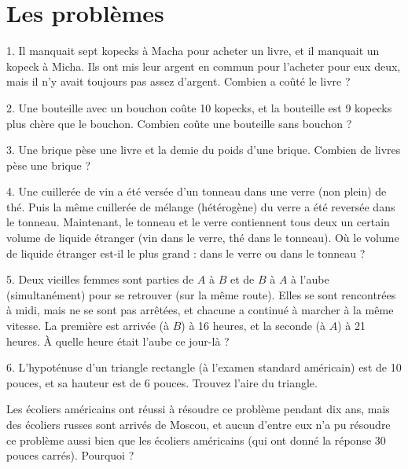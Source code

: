 \clearpage
\section*{Les problèmes}

\begin{problem}{1.}
Il manquait sept kopecks à Macha pour acheter un livre, et il manquait un kopeck à Micha. Ils ont mis leur argent en commun pour l'acheter pour eux deux, mais il n'y avait toujours pas assez d'argent. Combien a coûté le livre ?
\end{problem}

\begin{problem}{2.}
Une bouteille avec un bouchon coûte 10 kopecks, et la bouteille est 9 kopecks plus chère que le bouchon. Combien coûte une bouteille sans bouchon ?
\end{problem}

\begin{problem}{3.}
Une brique pèse une livre et la demie du poids d'une brique. Combien de livres pèse une brique ?
\end{problem}

\begin{problem}{4.}
Une cuillerée de vin a été versée d'un tonneau dans une verre (non plein) de thé. Puis la même cuillerée de mélange (hétérogène) du verre a été reversée dans le tonneau. Maintenant, le tonneau et le verre contiennent tous deux un certain volume de liquide étranger (vin dans le verre, thé dans le tonneau). Où le volume de liquide étranger est-il le plus grand : dans le verre ou dans le tonneau ?
\end{problem}

\begin{problem}{5.}
Deux vieilles femmes sont parties de $A$ à $B$ et de $B$ à $A$ à l'aube (simultanément) pour se retrouver (sur la même route). Elles se sont rencontrées à midi, mais ne se sont pas arrêtées, et chacune a continué à marcher à la même vitesse. La première est arrivée (à $B$) à 16 heures, et la seconde (à $A$) à 21 heures. À quelle heure était l'aube ce jour-là ?
\end{problem}

\begin{problem}{6.}
L'hypoténuse d'un triangle rectangle (à l'examen standard américain) est de 10 pouces, et sa hauteur est de 6 pouces. Trouvez l'aire du triangle.

Les écoliers américains ont réussi à résoudre ce problème pendant dix ans, mais des écoliers russes sont arrivés de Moscou, et aucun d'entre eux n'a pu résoudre ce problème aussi bien que les écoliers américains (qui ont donné la réponse 30 pouces carrés). Pourquoi ?
\end{problem}

